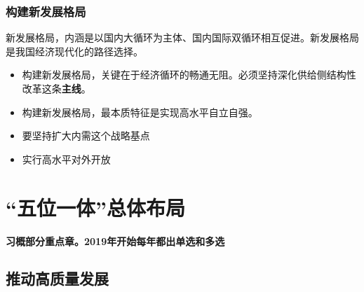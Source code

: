 \documentclass[12pt, a4paper, oneside]{ctexart}
\begin{document}
\subsubsection{构建新发展格局}

新发展格局，内涵是以国内大循环为主体、国内国际双循环相互促进。新发展格局是我国经济现代化的路径选择。

\begin{itemize}
  \item 构建新发展格局，关键在于经济循环的畅通无阻。必须坚持深化供给侧结构性改革这条\textbf{主线}。
  \item 构建新发展格局，最本质特征是实现高水平自立自强。
  \item 要坚持扩大内需这个战略基点
  \item 实行高水平对外开放
\end{itemize}

\section{“五位一体”总体布局}

\textbf{习概部分重点章。2019年开始每年都出单选和多选}

\subsection{推动高质量发展}
\end{document}
